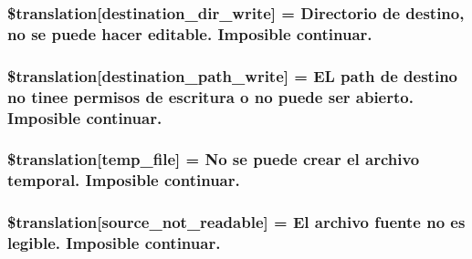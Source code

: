 \subsubsection[{\$translation}]{\setlength{\rightskip}{0pt plus 5cm}\$translation\mbox{[}\textquotesingle{}destination\+\_\+dir\+\_\+write\textquotesingle{}\mbox{]} = \textquotesingle{}Directorio de destino, no se puede hacer editable. Imposible continuar.\textquotesingle{}}\label{class_8upload_8es___e_s_8php_a97608ea194a616db49141a0e6dee900c}
\hypertarget{class_8upload_8es___e_s_8php_a40e4e1962226b89fd76da5819a9602b0}{}
\subsubsection[{\$translation}]{\setlength{\rightskip}{0pt plus 5cm}\$translation\mbox{[}\textquotesingle{}destination\+\_\+path\+\_\+write\textquotesingle{}\mbox{]} = \textquotesingle{}E\+L path de destino no tinee permisos de escritura o no puede ser abierto. Imposible continuar.\textquotesingle{}}\label{class_8upload_8es___e_s_8php_a40e4e1962226b89fd76da5819a9602b0}
\hypertarget{class_8upload_8es___e_s_8php_a2baece8da11e20d45175db91851ec3e3}{}
\subsubsection[{\$translation}]{\setlength{\rightskip}{0pt plus 5cm}\$translation\mbox{[}\textquotesingle{}temp\+\_\+file\textquotesingle{}\mbox{]} = \textquotesingle{}No se puede crear el archivo temporal. Imposible continuar.\textquotesingle{}}\label{class_8upload_8es___e_s_8php_a2baece8da11e20d45175db91851ec3e3}
\hypertarget{class_8upload_8es___e_s_8php_a922967ca2df0efdd455261142d8e5715}{}
\subsubsection[{\$translation}]{\setlength{\rightskip}{0pt plus 5cm}\$translation\mbox{[}\textquotesingle{}source\+\_\+not\+\_\+readable\textquotesingle{}\mbox{]} = \textquotesingle{}El archivo fuente no es legible. Imposible continuar.\textquotesingle{}}\label{class_8upload_8es___e_s_8php_a922967ca2df0efdd455261142d8e5715}
\hypertarget{class_8upload_8es___e_s_8php_a346dfd1ade29f583dd20d345c436859f}{}
